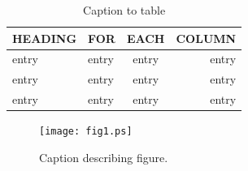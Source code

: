 \documentclass[preprint]{iucr}              %
\begin{document}






\begin{table}
\caption{Caption to table}
\begin{tabular}{llcr}      %
 HEADING    & FOR        & EACH       & COLUMN     \\
\hline
 entry      & entry      & entry      & entry      \\
 entry      & entry      & entry      & entry      \\
 entry      & entry      & entry      & entry      \\
\end{tabular}
\end{table}


\begin{figure}
\caption{Caption describing figure.}
\texttt{[image: fig1.ps]}
\end{figure}
\end{document}
